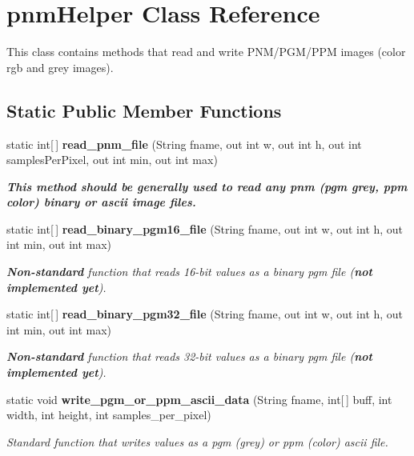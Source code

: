 \section{pnm\-Helper Class Reference}
\label{class_c_s_image_viewer_1_1pnm_helper}
This class contains methods that read and write PNM/PGM/PPM images (color rgb and grey images).  


\subsection*{Static Public Member Functions}
\begin{CompactItemize}
\item 
static int[$\,$] {\bf read\_\-pnm\_\-file} (String fname, out int w, out int h, out int samples\-Per\-Pixel, out int min, out int max)
\begin{CompactList}\small\item\em {\bf  This method should be generally used to read any pnm (pgm grey, ppm color) binary or ascii image files. } \item\end{CompactList}\item 
static int[$\,$] {\bf read\_\-binary\_\-pgm16\_\-file} (String fname, out int w, out int h, out int min, out int max)
\begin{CompactList}\small\item\em {\bf Non-standard} function that reads 16-bit values as a binary pgm file ({\bf not implemented yet}). \item\end{CompactList}\item 
static int[$\,$] {\bf read\_\-binary\_\-pgm32\_\-file} (String fname, out int w, out int h, out int min, out int max)
\begin{CompactList}\small\item\em {\bf Non-standard} function that reads 32-bit values as a binary pgm file ({\bf not implemented yet}). \item\end{CompactList}\item 
static void {\bf write\_\-pgm\_\-or\_\-ppm\_\-ascii\_\-data} (String fname, int[$\,$] buff, int width, int height, int samples\_\-per\_\-pixel)
\begin{CompactList}\small\item\em Standard function that writes values as a pgm (grey) or ppm (color) ascii file. \item\end{CompactList}\item 

\end{CompactItemize}
